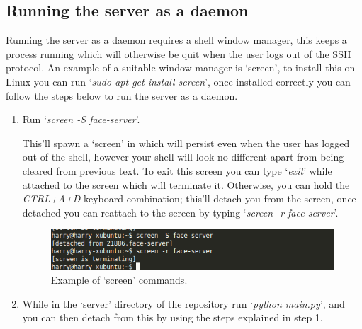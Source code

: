 \documentclass[a4paper]{article}
\begin{document}
    \subsection{Running the server as a daemon}
        Running the server as a daemon requires a shell window manager, this keeps a process running which will otherwise be quit when the user
        logs out of the SSH protocol. An example of a suitable window manager is `screen', to install this on Linux you can run 
        `\textit{sudo apt-get install screen}', once installed correctly you can follow the steps below to run the server as a daemon.
        \begin{enumerate}
            \item Run `\textit{screen -S face-server}'.

            This'll spawn a `screen' in which will persist even when the user has logged out of the shell, however your shell will look no different
            apart from being cleared from previous text. To exit this screen you can type `\textit{exit}' while attached to the screen which will terminate
            it. Otherwise, you can hold the \textit{CTRL+A+D} keyboard combination; this'll detach you from the screen, once detached you can reattach to 
            the screen by typing `\textit{screen -r face-server}'.

            \begin{figure}[H]
                \centering
                \caption{Example of `screen' commands.}
                \label{fig:screen}
                    \includegraphics[scale=0.6]{../shared_assets/screenshots/manual/screen.png}
            \end{figure}

            \item While in the `server' directory of the repository run `\textit{python main.py}', and you can then detach from this by using the steps
            explained in step 1.

        \end{enumerate}
\end{document}
